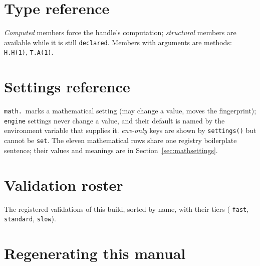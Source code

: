 \documentclass[11pt,openany]{report}
\newcommand{\vb}[1]{\texttt{#1}}
\begin{document}


\chapter{Type reference}\label{app:types}

\emph{Computed} members force the handle's computation; \emph{structural} members are available while it is
still \texttt{declared}. Members with arguments are methods: \texttt{H.H(1)}, \texttt{T.A(1)}.



\chapter{Settings reference}\label{app:settings}

\texttt{math.}\ marks a mathematical setting (may change a value, moves the fingerprint); \texttt{engine}
settings never change a value, and their default is named by the environment variable that supplies it.
\emph{env-only} keys are shown by \vb{settings()} but cannot be \texttt{set}. The eleven mathematical rows
share one registry boilerplate sentence; their values and meanings are in Section~\ref{sec:mathsettings}.



\chapter{Validation roster}\label{app:validations}

The \CMNumValidations{} registered validations of this build, sorted by name, with their tiers
(\CMNumFast{} \texttt{fast}, \CMNumStandard{} \texttt{standard}, \CMNumSlow{} \texttt{slow}).



\chapter{Regenerating this manual}\label{app:regen}
\end{document}
